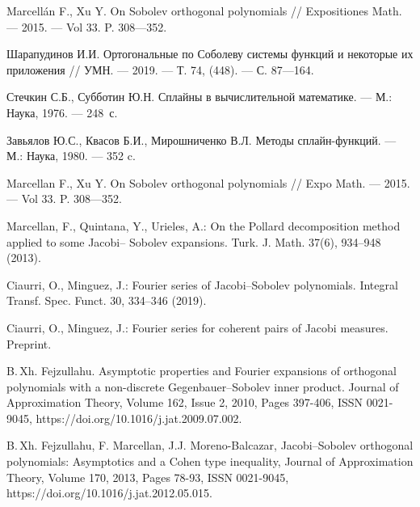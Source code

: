 \begin{thebibliography}{111}


  Marcellán F., Xu Y. On Sobolev orthogonal polynomials // Expositiones Math. --- 2015. --- Vol 33. P. 308---352.

  Шарапудинов И.И. Ортогональные по Соболеву системы функций и некоторые их приложения // УМН. --- 2019. --- Т. 74, (448). --- С. 87---164.

  Стечкин С.Б., Субботин Ю.Н.
  Сплайны в вычислительной математике.
  --- М.: Наука,
  1976. --- 248~с.

  Завьялов Ю.С., Квасов Б.И., Мирошниченко В.Л.
  Методы сплайн-функций.
  --- М.: Наука,
  1980.
  --- 352 c.

	Marcellan F., Xu Y. On Sobolev orthogonal polynomials // Expo Math. --- 2015. --- Vol 33. P. 308---352.
	
	
	
	
	Marcellan, F., Quintana, Y., Urieles, A.: On the Pollard decomposition method applied to some Jacobi–
	Sobolev expansions. Turk. J. Math. 37(6), 934–948 (2013).
	
	
	
	
	Ciaurri, O., Minguez, J.: Fourier series of Jacobi–Sobolev polynomials. Integral Transf. Spec. Funct.
	30, 334–346 (2019).
	
	
	
	
	Ciaurri, O., Minguez, J.: Fourier series for coherent pairs of Jacobi measures. Preprint.
	
	
	
	
	B.\,Xh. Fejzullahu. Asymptotic properties and Fourier expansions of orthogonal polynomials with a non-discrete Gegenbauer–Sobolev inner product. Journal of Approximation Theory, Volume 162, Issue 2, 2010, Pages 397-406, ISSN 0021-9045, https://doi.org/10.1016/j.jat.2009.07.002.
	
	
	
	
	B.\,Xh. Fejzullahu, F. Marcellan, J.J. Moreno-Balcazar, Jacobi–Sobolev orthogonal polynomials: Asymptotics and a Cohen type inequality, Journal of Approximation Theory,
	Volume 170, 2013, Pages 78-93, ISSN 0021-9045, https://doi.org/10.1016/j.jat.2012.05.015.
	

\end{thebibliography}
